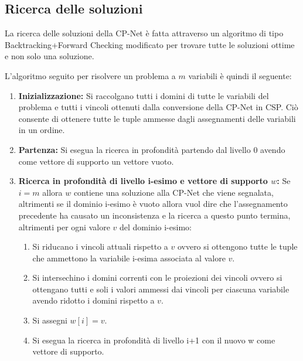 \subsection{Ricerca delle soluzioni}
La ricerca delle soluzioni della CP-Net è fatta attraverso un
algoritmo di tipo Backtracking+Forward Checking modificato per trovare
tutte le soluzioni ottime e non solo una soluzione.

L'algoritmo seguito per risolvere un problema a $m$ variabili è quindi
il seguente:
\begin{enumerate}
\item \textbf{Inizializzazione:} Si raccolgano tutti i domini di tutte
  le variabili del problema e tutti i vincoli ottenuti dalla
  conversione della CP-Net in CSP. Ciò consente di ottenere tutte le
  tuple ammesse dagli assegnamenti delle variabili in un ordine.
\item \textbf{Partenza:} Si esegua la ricerca in profondità partendo
  dal livello 0 avendo come vettore di supporto un vettore vuoto.
\item \textbf{Ricerca in profondità di livello i-esimo e vettore di
    supporto $w$:} Se $i=m$ allora $w$ contiene una soluzione alla
  CP-Net che viene segnalata, altrimenti se il dominio i-esimo è vuoto
  allora vuol dire che l'assegnamento precedente ha causato un
  inconsistenza e la ricerca a questo punto termina, altrimenti per
  ogni valore $v$ del dominio i-esimo:
  \begin{enumerate}
  \item Si riducano i vincoli attuali rispetto a $v$ ovvero si
    ottengono tutte le tuple che ammettono la variabile i-esima
    associata al valore $v$.
  \item Si intersechino i domini correnti con le proiezioni dei vincoli
    ovvero si ottengano tutti e soli i valori ammessi dai vincoli per
    ciascuna variabile avendo ridotto i domini rispetto a $v$.
  \item Si assegni $w[i]=v$.
  \item Si esegua la ricerca in profondità di livello i+1 con il nuovo
    w come vettore di supporto.
  \end{enumerate}
\end{enumerate}